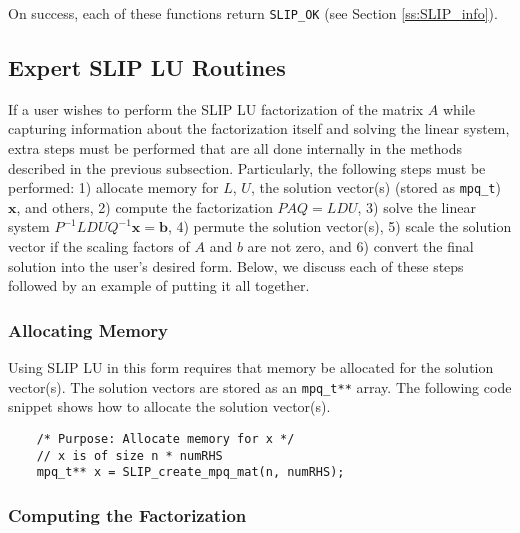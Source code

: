 \documentclass[12pt]{article}
\theoremstyle{definition}
\begin{document}
On success, each of these functions return \verb|SLIP_OK| (see Section
\ref{ss:SLIP_info}).

\cprotect\subsection{Expert SLIP LU Routines}
\label{s:Using:expert}

If a user wishes to perform the SLIP LU factorization of the matrix $A$ while
capturing information about the factorization itself and solving the linear
system, extra steps must be performed that are all done internally in the
methods described in the previous subsection. Particularly, the following steps
must be performed: 1) allocate memory for $L$, $U$, the solution vector(s)
(stored as \verb|mpq_t|) $\mathbf{x}$, and others, 2) compute the factorization
$PAQ = L D U$, 3) solve the linear system $P^{-1} L D U Q^{-1} \mathbf{x} =
\mathbf{b}$, 4) permute the solution vector(s), 5) scale the solution vector if
the scaling factors of $A$ and $b$ are not zero, and 6) convert the final
solution into the user's desired form. Below, we discuss each of these steps
followed by an example of putting it all together.

\subsubsection{Allocating Memory}

Using SLIP LU in this form requires that memory be allocated for the solution
vector(s). The solution vectors are stored as an \verb|mpq_t**| array.  The
following code snippet shows how to allocate the solution vector(s).

    {\small
    \begin{verbatim}
    /* Purpose: Allocate memory for x */
    // x is of size n * numRHS
    mpq_t** x = SLIP_create_mpq_mat(n, numRHS);
    \end{verbatim}}

\subsubsection{Computing the Factorization}
\end{document}
